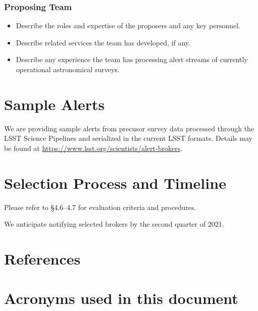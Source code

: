 \documentclass[DM,toc]{lsstdoc}
\begin{document}
\subsubsection{Proposing Team}

\begin{itemize}
\item Describe the roles and expertise of the proposers and any key personnel.
\item Describe related services the team has developed, if any.
\item Describe any experience the team has processing alert streams of currently operational astronomical surveys. 
\end{itemize}


\section{Sample Alerts}

We are providing sample alerts from precusor survey data processed through the LSST Science Pipelines and serialized in the current LSST formats.
Details may be found at \url{https://www.lsst.org/scientists/alert-brokers}.

\section{Selection Process and Timeline}

Please refer to  \S4.6--4.7 for evaluation criteria and procedures.

We anticipate notifying selected brokers by the second quarter of 2021.

\section{References} \label{sec:bib}

\renewcommand{\refname}{}


\section{Acronyms used in this document}\label{sec:acronyms}

\end{document}
